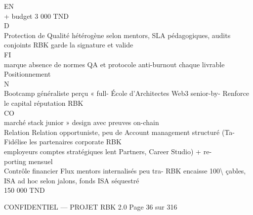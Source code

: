 \vspace{0.5em}
\vspace{0.5em}
EN\\
+ budget 3 000 TND\\
\vspace{0.5em}
\vspace{0.5em}
\vspace{0.5em}
\vspace{0.5em}
D\\
Protection de        Qualité hétérogène selon mentors, SLA pédagogiques, audits conjoints RBK garde la signature et valide\\
\vspace{0.5em}
\vspace{0.5em}
\vspace{0.5em}
\vspace{0.5em}
FI\\
marque               absence de normes QA              et protocole anti-burnout          chaque livrable\\
Positionnement\\
N\\
Bootcamp généraliste perçu « full- École d’Architectes Web3 senior-by- Renforce le capital réputation RBK\\
CO\\
marché               stack junior »                     design avec preuves on-chain\\
Relation             Relation opportuniste,    peu   de Account management structuré (Ta- Fidélise les partenaires corporate RBK\\
employeurs           comptes stratégiques               lent Partners, Career Studio) + re-\\
porting mensuel\\
Contrôle financier   Flux mentors internalisés peu tra- RBK encaisse 100\textbackslash{}%
çables, ISA ad hoc                 selon jalons, fonds ISA séquestré\\
150 000 TND\\
\vspace{0.5em}
\vspace{0.5em}
\vspace{0.5em}
\vspace{0.5em}
\begin{confidential}CONFIDENTIEL — PROJET RBK 2.0                               Page 36 sur 316\end{confidential}
